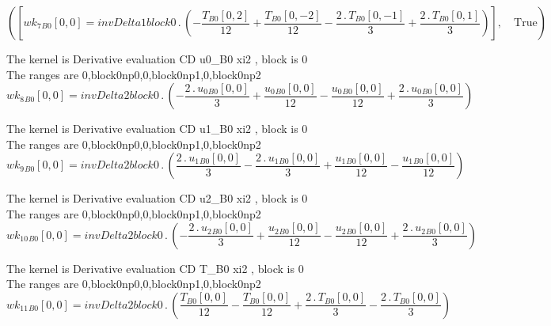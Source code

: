 \documentclass{article}
\begin{document}
\begin{dmath}\left ( \left [ {wk_{7}{_{B0}}}[{0,0}] = invDelta1block0 \,.\, \left(- \frac{{T{_{B0}}}[{0,2}]}{12} + \frac{{T{_{B0}}}[{0,-2}]}{12} - \frac{2 \,.\, {T{_{B0}}}[{0,-1}]}{3} + \frac{2 \,.\, {T{_{B0}}}[{0,1}]}{3}\right)\right ], \quad 
\mathrm{True}\right )\end{dmath}

\noindent The kernel is Derivative evaluation CD u0_B0 xi2 , block is 0\\\noindent The ranges are 0,block0np0,0,block0np1,0,block0np2\\\begin{dmath}{wk_{8}{_{B0}}}[{0,0}] = invDelta2block0 \,.\, \left(- \frac{2 \,.\, {u_{0}{_{B0}}}[{0,0}]}{3} + \frac{{u_{0}{_{B0}}}[{0,0}]}{12} - \frac{{u_{0}{_{B0}}}[{0,0}]}{12} + \frac{2 \,.\, {u_{0}{_{B0}}}[{0,0}]}{3}\right)\end{dmath}

\noindent The kernel is Derivative evaluation CD u1_B0 xi2 , block is 0\\\noindent The ranges are 0,block0np0,0,block0np1,0,block0np2\\\begin{dmath}{wk_{9}{_{B0}}}[{0,0}] = invDelta2block0 \,.\, \left(\frac{2 \,.\, {u_{1}{_{B0}}}[{0,0}]}{3} - \frac{2 \,.\, {u_{1}{_{B0}}}[{0,0}]}{3} + \frac{{u_{1}{_{B0}}}[{0,0}]}{12} - \frac{{u_{1}{_{B0}}}[{0,0}]}{12}\right)\end{dmath}

\noindent The kernel is Derivative evaluation CD u2_B0 xi2 , block is 0\\\noindent The ranges are 0,block0np0,0,block0np1,0,block0np2\\\begin{dmath}{wk_{10}{_{B0}}}[{0,0}] = invDelta2block0 \,.\, \left(- \frac{2 \,.\, {u_{2}{_{B0}}}[{0,0}]}{3} + \frac{{u_{2}{_{B0}}}[{0,0}]}{12} - \frac{{u_{2}{_{B0}}}[{0,0}]}{12} + \frac{2 \,.\, {u_{2}{_{B0}}}[{0,0}]}{3}\right)\end{dmath}

\noindent The kernel is Derivative evaluation CD T_B0 xi2 , block is 0\\\noindent The ranges are 0,block0np0,0,block0np1,0,block0np2\\\begin{dmath}{wk_{11}{_{B0}}}[{0,0}] = invDelta2block0 \,.\, \left(\frac{{T{_{B0}}}[{0,0}]}{12} - \frac{{T{_{B0}}}[{0,0}]}{12} + \frac{2 \,.\, {T{_{B0}}}[{0,0}]}{3} - \frac{2 \,.\, {T{_{B0}}}[{0,0}]}{3}\right)\end{dmath}
\end{document}
